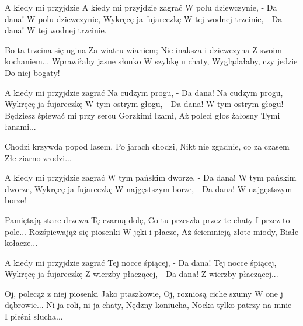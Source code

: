A kiedy mi przyjdzie
A kiedy mi przyjdzie zagrać
W polu dziewczynie,
- Da dana!
W polu dziewczynie,
Wykręcę ja fujareczkę
W tej wodnej trzcinie,
- Da dana!
W tej wodnej trzcinie.

Bo ta trzcina się ugina
Za wiatru wianiem;
Nie inaksza i dziewczyna
Z swoim kochaniem...
Wprawiłaby jasne słonko
W szybkę u chaty,
Wyglądałaby, czy jedzie
Do niej bogaty!

A kiedy mi przyjdzie zagrać
Na cudzym progu,
- Da dana!
Na cudzym progu,
Wykręcę ja fujareczkę
W tym ostrym głogu,
- Da dana!
W tym ostrym głogu!
Będziesz śpiewać mi przy sercu
Gorzkimi łzami,
Aż poleci głos żałosny
Tymi łanami...

Chodzi krzywda popod lasem,
Po jarach chodzi,
Nikt nie zgadnie, co za czasem
Złe ziarno zrodzi...

A kiedy mi przyjdzie zagrać
W tym pańskim dworze,
- Da dana!
W tym pańskim dworze,
Wykręcę ja fujareczkę
W najgęstszym borze,
- Da dana!
W najgęstszym borze!

Pamiętają stare drzewa
Tę czarną dolę,
Co tu przeszła przez te chaty
I przez to pole...
Rozśpiewająż się piosenki
W jęki i płacze,
Aż ściemnieją złote miody,
Białe kołacze...

A kiedy mi przyjdzie zagrać
Tej nocce śpiącej,
- Da dana!
Tej nocce śpiącej,
Wykręcę ja fujareczkę
Z wierzby płaczącej,
- Da dana!
Z wierzby płaczącej...

Oj, polecąż z niej piosenki
Jako ptaszkowie,
Oj, rozniosą ciche szumy
W one j dąbrowie...
Ni ja roli, ni ja chaty,
Nędzny koniucha,
Nocka tylko patrzy na mnie -
I pieśni słucha...